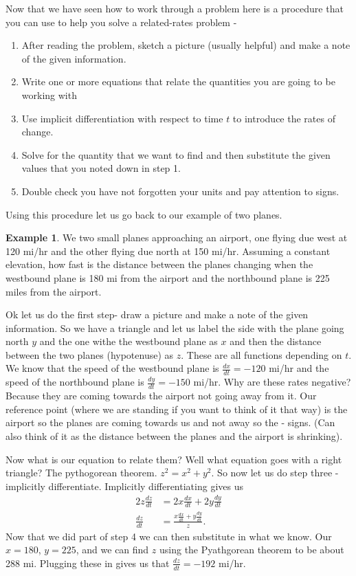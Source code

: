 \documentclass[12pt,reqno]{article}
\theoremstyle{definition}
\newtheorem*{Example}{Example}
\begin{document}
Now that we have seen how to work through a problem here is a procedure that you can use to help you solve a related-rates problem - 
\begin{enumerate}
	\item[1.] After reading the problem, sketch a picture (usually helpful) and make a note of the given information. 
	\item[2.] Write one or more equations that relate the quantities you are going to be working with 
	\item[3.] Use implicit differentiation with respect to time $t$ to introduce the rates of change. 
	\item[4.] Solve for the quantity that we want to find and then substitute the given values that you noted down in step 1. 
	\item[5.] Double check you have not forgotten your units and pay attention to signs. 
\end{enumerate}

Using this procedure let us go back to our example of two planes. 
\begin{Example}
	We two small planes approaching an airport, one flying due west at 120 mi/hr and the other flying due north at 150 mi/hr. Assuming a constant elevation, how fast is the distance between the planes changing when the westbound plane is 180 mi from the airport and the northbound plane is 225 miles from the airport. 
	
	Ok let us do the first step- draw a picture and make a note of the given information. So we have a triangle and let us label the side with the plane going north $y$ and the one withe the westbound plane as $x$ and then the distance between the two planes (hypotenuse) as $z$. These are all functions depending on $t$. We know that the speed of the westbound plane is $\frac{dx}{dt} = -120$ mi/hr and the speed of the northbound plane is $\frac{dy}{dt} = - 150$ mi/hr. Why are these rates negative? Because they are coming towards the airport not going away from it. Our reference point (where we are standing if you want to think of it that way) is the airport so the planes are coming towards us and not away so the - signs. (Can also think of it as the distance between the planes and the airport is shrinking). 
	
	Now what is our equation to relate them? Well what equation goes with a right triangle? The pythogorean theorem. $z^2 = x^2 + y^2$. So now let us do step three - implicitly differentiate. Implicitly differentiating gives us 
	\begin{align*}
		2z \frac{dz}{dt} &= 2x \frac{dx}{dt} + 2y \frac{dy}{dt} \\
		\frac{dz}{dt} &= \frac{x \frac{dx}{dt} + y \frac{dy}{dt}}{z}.
	\end{align*}
	Now that we did part of step 4 we can then substitute in what we know. Our $x = 180$, $y = 225$, and we can find $z$ using the Pyathgorean theorem to be about 288 mi. Plugging these in gives us that $\frac{dz}{dt} = - 192$ mi/hr. 
\end{Example}
\end{document}
